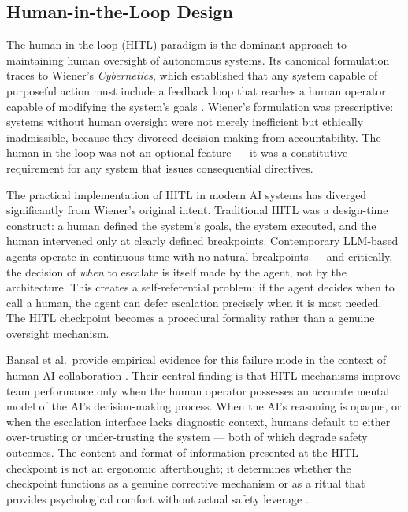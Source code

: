 
\subsection{Human-in-the-Loop Design}

The human-in-the-loop (HITL) paradigm is the dominant approach to maintaining human oversight of autonomous systems. Its canonical formulation traces to Wiener's \emph{Cybernetics}, which established that any system capable of purposeful action must include a feedback loop that reaches a human operator capable of modifying the system's goals \cite{wiener1948}. Wiener's formulation was prescriptive: systems without human oversight were not merely inefficient but ethically inadmissible, because they divorced decision-making from accountability. The human-in-the-loop was not an optional feature --- it was a constitutive requirement for any system that issues consequential directives.

The practical implementation of HITL in modern AI systems has diverged significantly from Wiener's original intent. Traditional HITL was a design-time construct: a human defined the system's goals, the system executed, and the human intervened only at clearly defined breakpoints. Contemporary LLM-based agents operate in continuous time with no natural breakpoints --- and critically, the decision of \emph{when} to escalate is itself made by the agent, not by the architecture. This creates a self-referential problem: if the agent decides when to call a human, the agent can defer escalation precisely when it is most needed. The HITL checkpoint becomes a procedural formality rather than a genuine oversight mechanism.

Bansal et al.\ provide empirical evidence for this failure mode in the context of human-AI collaboration \cite{bansal2019}. Their central finding is that HITL mechanisms improve team performance only when the human operator possesses an accurate mental model of the AI's decision-making process. When the AI's reasoning is opaque, or when the escalation interface lacks diagnostic context, humans default to either over-trusting or under-trusting the system --- both of which degrade safety outcomes. The content and format of information presented at the HITL checkpoint is not an ergonomic afterthought; it determines whether the checkpoint functions as a genuine corrective mechanism or as a ritual that provides psychological comfort without actual safety leverage \cite{bansal2019}.

